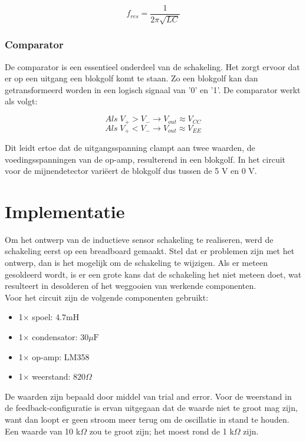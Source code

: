 \documentclass{report}
\begin{document}
\begin{equation}
f_{res}=\frac{1}{2\pi\sqrt{LC}}
\end{equation}

\subsubsection{Comparator}
De comparator is een essentieel onderdeel van de schakeling. Het zorgt ervoor dat er op een uitgang een blokgolf komt te staan. Zo een blokgolf kan dan getransformeerd worden in een logisch signaal van '0' en '1'. De comparator werkt als volgt:

\begin{equation}
Als \;V_+ > V_- \rightarrow V_{out}\approx V_{CC}
\end{equation}
\begin{equation}
Als \; V_+ < V_- \rightarrow V_{out}\approx V_{EE}
\end{equation}

\noindent
Dit leidt ertoe dat de uitgangsspanning clampt aan twee waarden, de voedingsspanningen van de op-amp, resulterend in een blokgolf. In het circuit voor de mijnendetector variëert de blokgolf dus tussen de 5 V en 0 V.\\

\section{Implementatie}
Om het ontwerp van de inductieve sensor schakeling te realiseren, werd de schakeling eerst op een breadboard gemaakt. Stel dat er problemen zijn met het ontwerp, dan is het mogelijk om de schakeling te wijzigen. Als er meteen gesoldeerd wordt, is er een grote kans dat de schakeling het niet meteen doet, wat resulteert in desolderen of het weggooien van werkende componenten.\\ 

\noindent Voor het circuit zijn de volgende componenten gebruikt:
\begin{itemize}
\item 1$\times$ spoel: $4.7 \mathrm{mH}$
\item 1$\times$ condensator: $30 \mu \mathrm{F}$
\item 1$\times$ op-amp: LM358
\item 1$\times$ weerstand: $820 \Omega$
\end{itemize}

\noindent
De waarden zijn bepaald door middel van trial and error. Voor de weerstand in de feedback-configuratie is ervan uitgegaan dat de waarde niet te groot mag zijn, want dan loopt er geen stroom meer terug om de oscillatie in stand te houden. Een waarde van 10 k$\Omega$ zou te groot zijn; het moest rond de 1 k$\Omega$ zijn.
\end{document}
